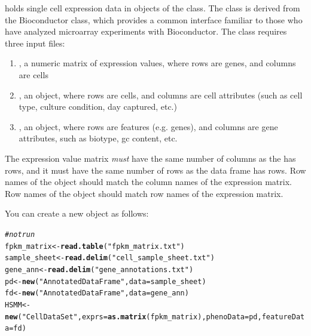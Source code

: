 \documentclass[10pt,oneside]{article}\usepackage[]{graphicx}\usepackage[]{color}
\makeatletter
\newcommand{\hlstr}[1]{\textcolor[rgb]{0.192,0.494,0.8}{#1}}%
\newcommand{\hlcom}[1]{\textcolor[rgb]{0.678,0.584,0.686}{\textit{#1}}}%
\newcommand{\hlstd}[1]{\textcolor[rgb]{0.345,0.345,0.345}{#1}}%
\newcommand{\hlkwb}[1]{\textcolor[rgb]{0.69,0.353,0.396}{#1}}%
\newcommand{\hlkwc}[1]{\textcolor[rgb]{0.333,0.667,0.333}{#1}}%
\newcommand{\hlkwd}[1]{\textcolor[rgb]{0.737,0.353,0.396}{\textbf{#1}}}%
\newenvironment{kframe}{%
 \def\at@end@of@kframe{}%
 \ifinner\ifhmode%
  \def\at@end@of@kframe{\end{minipage}}%
  \begin{minipage}{\columnwidth}%
 \fi\fi%
 \def\FrameCommand##1{\hskip\@totalleftmargin \hskip-\fboxsep
 \colorbox{shadecolor}{##1}\hskip-\fboxsep
     \hskip-\linewidth \hskip-\@totalleftmargin \hskip\columnwidth}%
 \MakeFramed {\advance\hsize-\width
   \@totalleftmargin\z@ \linewidth\hsize
   \@setminipage}}%
 {\par\unskip\endMakeFramed%
 \at@end@of@kframe}
\newenvironment{knitrout}{}{} %
\makeatother
\begin{document}
 holds single cell expression data in objects of the  class. The class is derived from the Bioconductor  class, which provides a common interface familiar to those who have analyzed microarray experiments with Bioconductor. The class requires three input files:
\begin{enumerate}
  \item {}, a numeric matrix of expression values, where rows are genes, and columns are cells
  \item {}, an  object, where rows are cells, and columns are cell attributes (such as cell type, culture condition, day captured, etc.)
  \item {}, an  object, where rows are features (e.g. genes), and columns are gene attributes, such as biotype, gc content, etc.
\end{enumerate}

The expression value matrix \emph{must} have the same number of columns as the  has rows, and it must have the same number of rows as the  data frame has rows. Row names of the  object should match the column names of the expression matrix. Row names of the  object should match row names of the expression matrix.

You can create a new  object as follows:  

\begin{knitrout}
\color{fgcolor}\begin{kframe}
\begin{alltt}
\hlcom{# not run}
\hlstd{fpkm_matrix} \hlkwb{<-} \hlkwd{read.table}\hlstd{(}\hlstr{"fpkm_matrix.txt"}\hlstd{)}
\hlstd{sample_sheet} \hlkwb{<-} \hlkwd{read.delim}\hlstd{(}\hlstr{"cell_sample_sheet.txt"}\hlstd{)}
\hlstd{gene_ann} \hlkwb{<-} \hlkwd{read.delim}\hlstd{(}\hlstr{"gene_annotations.txt"}\hlstd{)}
\hlstd{pd} \hlkwb{<-} \hlkwd{new}\hlstd{(}\hlstr{"AnnotatedDataFrame"}\hlstd{,} \hlkwc{data} \hlstd{= sample_sheet)}
\hlstd{fd} \hlkwb{<-} \hlkwd{new}\hlstd{(}\hlstr{"AnnotatedDataFrame"}\hlstd{,} \hlkwc{data} \hlstd{= gene_ann)}
\hlstd{HSMM} \hlkwb{<-} \hlkwd{new}\hlstd{(}\hlstr{"CellDataSet"}\hlstd{,} \hlkwc{exprs} \hlstd{=} \hlkwd{as.matrix}\hlstd{(fpkm_matrix),} \hlkwc{phenoData} \hlstd{= pd,} \hlkwc{featureData} \hlstd{= fd)}
\end{alltt}
\end{kframe}
\end{knitrout}
\end{document}
